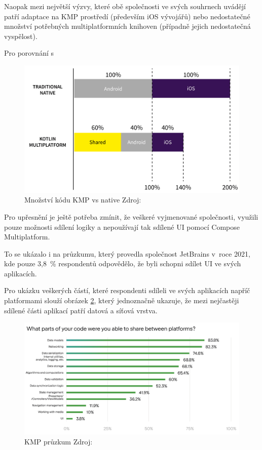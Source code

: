 Naopak mezi největší výzvy, které obě společnosti ve svých souhrnech uvádějí patří adaptace na KMP prostředí (především iOS vývojářů) nebo
nedostatečné množství potřebných multiplatformních knihoven (případně jejich nedostatečná vyspělost). \cite{KMPinForbes} \cite{KMPinMcDonalds}

Pro porovnání s 

\emph{}

\begin{figure}[H]
  \centering
  \includegraphics[width=.55\textwidth]{chart-KMP-vs-native.png}
  \caption{Množství kódu KMP vs native Zdroj: \cite{imgMnozstviSdilenehoKodu}}  
  \label{fig:KMP_vs_native}
\end{figure}

Pro upřesnění je ještě potřeba zmínit, že veškeré vyjmenované společnosti, využili pouze možnosti sdílení logiky a nepoužívají
tak sdílené UI pomocí Compose Multiplatform.

To se ukázalo i na průzkumu, který provedla společnost JetBrains v~roce 2021, kde pouze 3,8~\% respondentů odpovědělo, že byli schopni sdílet UI ve svých aplikacích.

Pro ukázku veškerých částí, které respondenti sdíleli ve svých aplikacích napříč platformami slouží obrázek \ref{fig:KMPSurvey}, který jednoznačně ukazuje, že
mezi nejčastěji sdílené části aplikací patří datová a síťová vrstva.  

\begin{figure}[H]
  \centering
  \includegraphics[width=1\textwidth]{survey-results-q1-q2-22-light.jpg}
  \caption{KMP průzkum Zdroj: \cite{imgSurvey}}
  \label{fig:KMPSurvey}
\end{figure}

